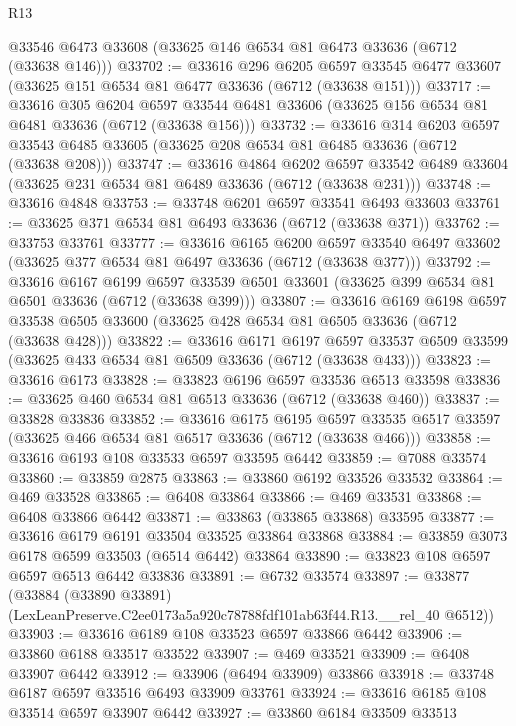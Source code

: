 \begin{lexlean}{R13}
\begin{coremodule}
    @33546
    @6473
    @33608
    (@33625 @146 @6534 @81 @6473 @33636 (@6712 (@33638 @146)))
@33702 := @33616
    @296
    @6205
    @6597
    @33545
    @6477
    @33607
    (@33625 @151 @6534 @81 @6477 @33636 (@6712 (@33638 @151)))
@33717 := @33616
    @305
    @6204
    @6597
    @33544
    @6481
    @33606
    (@33625 @156 @6534 @81 @6481 @33636 (@6712 (@33638 @156)))
@33732 := @33616
    @314
    @6203
    @6597
    @33543
    @6485
    @33605
    (@33625 @208 @6534 @81 @6485 @33636 (@6712 (@33638 @208)))
@33747 := @33616
    @4864
    @6202
    @6597
    @33542
    @6489
    @33604
    (@33625 @231 @6534 @81 @6489 @33636 (@6712 (@33638 @231)))
@33748 := @33616 @4848
@33753 := @33748 @6201 @6597 @33541 @6493 @33603
@33761 := @33625 @371 @6534 @81 @6493 @33636 (@6712 (@33638 @371))
@33762 := @33753 @33761
@33777 := @33616
    @6165
    @6200
    @6597
    @33540
    @6497
    @33602
    (@33625 @377 @6534 @81 @6497 @33636 (@6712 (@33638 @377)))
@33792 := @33616
    @6167
    @6199
    @6597
    @33539
    @6501
    @33601
    (@33625 @399 @6534 @81 @6501 @33636 (@6712 (@33638 @399)))
@33807 := @33616
    @6169
    @6198
    @6597
    @33538
    @6505
    @33600
    (@33625 @428 @6534 @81 @6505 @33636 (@6712 (@33638 @428)))
@33822 := @33616
    @6171
    @6197
    @6597
    @33537
    @6509
    @33599
    (@33625 @433 @6534 @81 @6509 @33636 (@6712 (@33638 @433)))
@33823 := @33616 @6173
@33828 := @33823 @6196 @6597 @33536 @6513 @33598
@33836 := @33625 @460 @6534 @81 @6513 @33636 (@6712 (@33638 @460))
@33837 := @33828 @33836
@33852 := @33616
    @6175
    @6195
    @6597
    @33535
    @6517
    @33597
    (@33625 @466 @6534 @81 @6517 @33636 (@6712 (@33638 @466)))
@33858 := @33616 @6193 @108 @33533 @6597 @33595 @6442
@33859 := @7088 @33574
@33860 := @33859 @2875
@33863 := @33860 @6192 @33526 @33532
@33864 := @469 @33528
@33865 := @6408 @33864
@33866 := @469 @33531
@33868 := @6408 @33866 @6442
@33871 := @33863 (@33865 @33868) @33595
@33877 := @33616 @6179 @6191 @33504 @33525 @33864 @33868
@33884 := @33859 @3073 @6178 @6599 @33503 (@6514 @6442) @33864
@33890 := @33823 @108 @6597 @6597 @6513 @6442 @33836
@33891 := @6732 @33574
@33897 := @33877
    (@33884 (@33890 @33891) (LexLeanPreserve.C2ee0173a5a920c78788fdf101ab63f44.R13.__rel_40 @6512))
@33903 := @33616 @6189 @108 @33523 @6597 @33866 @6442
@33906 := @33860 @6188 @33517 @33522
@33907 := @469 @33521
@33909 := @6408 @33907 @6442
@33912 := @33906 (@6494 @33909) @33866
@33918 := @33748 @6187 @6597 @33516 @6493 @33909 @33761
@33924 := @33616 @6185 @108 @33514 @6597 @33907 @6442
@33927 := @33860 @6184 @33509 @33513

\end{coremodule}
\end{lexlean}
